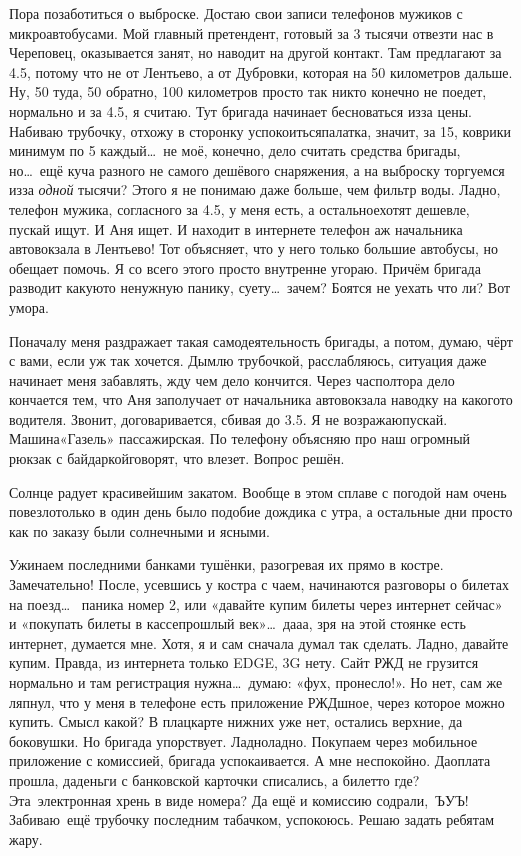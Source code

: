 Пора позаботиться о выброске. Достаю свои записи телефонов мужиков с микроавтобусами. Мой главный претендент, готовый за 3 тысячи отвезти нас в Череповец, оказывается занят, но наводит на другой контакт. Там предлагают за 4.5, потому что не от Лентьево, а от Дубровки, которая на 50 километров дальше. Ну, 50 туда, 50 обратно, 100 километров просто так никто конечно не поедет, нормально и за 4.5, я считаю. Тут бригада начинает бесноваться из\sdash за цены. Набиваю трубочку, отхожу в сторонку успокоиться\mdash палатка, значит, за 15, коврики минимум по 5 каждый\ldots~не моё, конечно, дело считать средства бригады, но\ldots~ещё куча разного не самого дешёвого снаряжения, а на выброску торгуемся из\sdash за \textit{одной} тысячи? Этого я не понимаю даже больше, чем фильтр воды. Ладно, телефон  мужика, согласного за 4.5, у  меня есть, а остальное\mdash хотят дешевле, пускай ищут. И Аня ищет. И находит в интернете телефон аж начальника автовокзала в Лентьево! Тот объясняет, что у него только большие автобусы, но обещает помочь. Я со всего этого просто внутренне угораю. Причём бригада разводит какую\sdash то ненужную панику, суету\ldots~зачем? Боятся не уехать что ли? Вот умора.

Поначалу меня раздражает такая самодеятельность бригады, а потом, думаю, чёрт с вами, если уж так хочется. Дымлю трубочкой, расслабляюсь, ситуация даже начинает меня забавлять, жду чем дело кончится. Через час\sdash полтора дело кончается тем, что Аня заполучает от начальника автовокзала наводку на какого\sdash то водителя. Звонит, договаривается, сбивая до 3.5. Я не возражаю\mdash пускай. Машина\mdash «Газель» пассажирская. По телефону объясняю про наш огромный рюкзак с байдаркой\mdash говорят, что влезет. Вопрос решён.

Солнце радует красивейшим закатом. Вообще в этом сплаве с погодой нам очень повезло\mdash только в один день было подобие дождика с утра, а остальные дни просто как по заказу были солнечными и ясными.

Ужинаем последними банками тушёнки, разогревая их прямо в костре. Замечательно! После, усевшись у костра с чаем, начинаются разговоры о билетах на поезд\ldots~ паника номер 2, или «давайте купим билеты через интернет сейчас» и «покупать билеты в кассе\mdash прошлый век»\ldots~д\sdash а\sdash а\sdash а, зря на этой стоянке есть интернет, думается мне. Хотя, я и сам сначала думал так сделать. Ладно, давайте купим. Правда, из интернета только EDGE, 3G нету. Сайт РЖД не грузится нормально и там регистрация нужна\ldots~думаю: «фух, пронесло!». Но нет, сам же ляпнул, что у меня в телефоне есть приложение РЖД\sdash шное, через которое можно купить. Смысл какой? В плацкарте нижних уже нет, остались верхние, да боковушки. Но бригада упорствует. Ладно\sdash ладно. Покупаем через мобильное приложение с комиссией, бригада успокаивается. А мне неспокойно. Да\mdash оплата прошла, да\mdash деньги с банковской карточки списались, а билет\sdash то где? Эта~электронная хрень в виде номера? Да ещё и комиссию содрали,~ЪУЪ! Забиваю~ещё трубочку последним табачком, успокоюсь. Решаю задать ребятам жару.

